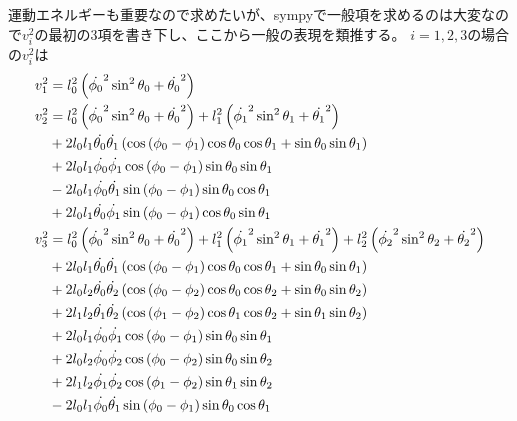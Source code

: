 \documentclass{jsarticle}
\newcommand{\eqa}[1]{\begin{align}#1\end{align}}
\begin{document}
運動エネルギーも重要なので求めたいが、sympyで一般項を求めるのは大変なので$v^2_i$の最初の3項を書き下し、ここから一般の表現を類推する。
$i=1,2,3$の場合の$v^2_i$は
\eqa{
	v^2_1 &= l_0^2 \left(\dot{\phi_0}^2\sin^2{\theta_0} + \dot{\theta_0}^2\right) \\
	v^2_2 &= l_0^2 \left(\dot{\phi_0}^2\sin^2{\theta_0} + \dot{\theta_0}^2\right) + l_1^2 \left(\dot{\phi_1}^2\sin^2{\theta_1} + \dot{\theta_1}^2\right) \notag\\
		&+ 2 l_0 l_1 \dot{\theta_0} \dot{\theta_1} \left(\cos{\left (\phi_0 - \phi_1 \right )} \cos{\theta_0} \cos{\theta_1} + \sin{\theta_0} \sin{\theta_1} \right) \notag\\
		&+ 2 l_0 l_1 \dot{\phi_0} \dot{\phi_1} \cos{\left (\phi_0 - \phi_1 \right )} \sin{\theta_0} \sin{\theta_1} \notag\\
		&- 2 l_0 l_1 \dot{\phi_0} \dot{\theta_1} \sin{\left (\phi_0 - \phi_1 \right )} \sin{\theta_0} \cos{\theta_1} \notag\\
		&+ 2 l_0 l_1 \dot{\theta_0} \dot{\phi_1} \sin{\left (\phi_0 - \phi_1 \right )} \cos{\theta_0} \sin{\theta_1} \\
	v^2_3 &= l_0^2 \left(\dot{\phi_0}^2\sin^2{\theta_0} + \dot{\theta_0}^2\right)
		+ l_1^2 \left(\dot{\phi_1}^2 \sin^2{\theta_1} + \dot{\theta_1}^2 \right)
		+ l_2^2 \left(\dot{\phi_2}^2 \sin^2{\theta_2} + \dot{\theta_2}^2\right) \notag\\
		&+ 2 l_0 l_1 \dot{\theta_0} \dot{\theta_1} \left(\cos{\left (\phi_0 - \phi_1 \right )} \cos{\theta_0} \cos{\theta_1} + \sin{\theta_0} \sin{\theta_1}\right) \notag\\
		&+ 2 l_0 l_2 \dot{\theta_0} \dot{\theta_2} \left(\cos{\left (\phi_0 - \phi_2 \right )} \cos{\theta_0} \cos{\theta_2} + \sin{\theta_0} \sin{\theta_2}\right) \notag\\
		&+ 2 l_1 l_2 \dot{\theta_1} \dot{\theta_2} \left(\cos{\left (\phi_1 - \phi_2 \right )} \cos{\theta_1} \cos{\theta_2} + \sin{\theta_1} \sin{\theta_2}\right) \notag\\
		&+ 2 l_0 l_1 \dot{\phi_0} \dot{\phi_1} \cos{\left (\phi_0 - \phi_1 \right )} \sin{\theta_0} \sin{\theta_1} \notag\\
		&+ 2 l_0 l_2 \dot{\phi_0} \dot{\phi_2} \cos{\left (\phi_0 - \phi_2 \right )} \sin{\theta_0} \sin{\theta_2} \notag\\
		&+ 2 l_1 l_2 \dot{\phi_1} \dot{\phi_2} \cos{\left (\phi_1 - \phi_2 \right )} \sin{\theta_1} \sin{\theta_2} \notag\\
		&- 2 l_0 l_1 \dot{\phi_0} \dot{\theta_1} \sin{\left (\phi_0 - \phi_1 \right )} \sin{\theta_0} \cos{\theta_1} \notag\\
}
\end{document}
